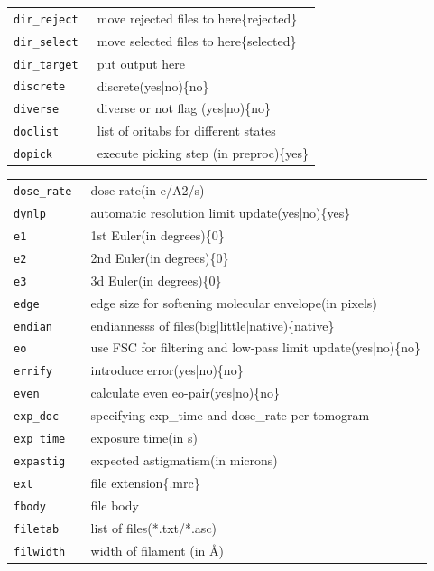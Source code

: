 \documentclass[a4paper,11pt]{article}
\begin{document}
\begin{tabular}{ll}
\texttt{dir\_reject      }&{ move rejected files to here\{rejected\}}\\
\texttt{dir\_select      }&{ move selected files to here\{selected\}}\\
\texttt{dir\_target      }&{ put output here}\\
\texttt{discrete        }&{ discrete(yes|no)\{no\}}\\
\texttt{diverse         }&{ diverse or not flag (yes|no)\{no\}}\\
\texttt{doclist         }&{ list of oritabs for different states}\\
\texttt{dopick          }&{ execute picking step (in preproc)\{yes\}}\\
\end{tabular}

\begin{tabular}{ll}
\texttt{dose\_rate       }&{ dose rate(in e/A2/s)}\\
\texttt{dynlp           }&{ automatic resolution limit update(yes|no)\{yes\}}\\
\texttt{e1              }&{ 1st Euler(in degrees)\{0\}}\\
\texttt{e2              }&{ 2nd Euler(in degrees)\{0\}}\\
\texttt{e3              }&{ 3d Euler(in degrees)\{0\}}\\
\texttt{edge            }&{ edge size for softening molecular envelope(in pixels)}\\
\texttt{endian          }&{ endiannesss of files(big|little|native)\{native\}}\\
\texttt{eo              }&{ use FSC for filtering and low-pass limit update(yes|no)\{no\}}\\
\texttt{errify          }&{ introduce error(yes|no)\{no\}}\\
\texttt{even            }&{ calculate even eo-pair(yes|no)\{no\}}\\
\texttt{exp\_doc         }&{ specifying exp\_time and dose\_rate per tomogram}\\
\texttt{exp\_time        }&{ exposure time(in s)}\\
\texttt{expastig        }&{ expected astigmatism(in microns)}\\
\texttt{ext             }&{ file extension\{.mrc\}}\\
\texttt{fbody           }&{ file body}\\
\texttt{filetab         }&{ list of files(*.txt/*.asc)}\\
\texttt{filwidth        }&{ width of filament (in \AA{})}\\

\end{tabular}
\end{document}
